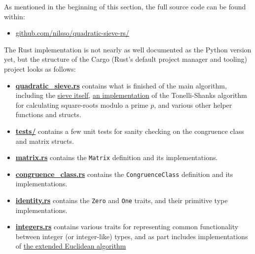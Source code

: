 \documentclass{report}
\begin{document}
\noindent
As mentioned in the beginning of this section, the full source code
can be found within:
\begin{itemize}
    \item \href{https://github.com/nilsso/quadratic-sieve-rs/tree/main/src}{github.com/nilsso/quadratic-sieve-rs/}
\end{itemize}
The Rust implementation is not nearly as well documented as the Python version
yet, but the structure of the Cargo (Rust's default project manager and
tooling) project looks as follows:
\begin{itemize}
    \item %
        \href{https://github.com/nilsso/quadratic-sieve-rs/blob/main/src/quadratic\_sieve.rs}{\textbf{quadratic\_sieve.rs}}
        contains what is finished of the main algorithm, including the
        \href{https://github.com/nilsso/quadratic-sieve-rs/blob/main/src/quadratic\_sieve.rs#L115}{sieve itself},
        \href{https://github.com/nilsso/quadratic-sieve-rs/blob/main/src/quadratic\_sieve.rs#L74}{an implementation}
        of the Tonelli-Shanks algorithm for calculating square-roots modulo a
        prime $p$, and various other helper functions and structs.
    \item %
        \href{https://github.com/nilsso/quadratic-sieve-rs/tree/main/tests}{\textbf{tests/}}
        contains a few unit tests for sanity checking on the congruence class
        and matrix structs.
    \item %
        \href{https://github.com/nilsso/quadratic-sieve-rs/blob/main/src/matrix.rs}{\textbf{matrix.rs}}
        contains the \texttt{Matrix} definition and its implementations.
    \item %
        \href{https://github.com/nilsso/quadratic-sieve-rs/blob/main/src/congruence\_class.rs}{\textbf{congruence\_class.rs}}
        contains the \texttt{CongruenceClass} definition and its implementations.
    \item %
        \href{https://github.com/nilsso/quadratic-sieve-rs/blob/main/src/identity.rs}{\textbf{identity.rs}}
        contains the \texttt{Zero} and \texttt{One} traits, and their primitive type
        implementations.
    \item %
        \href{https://github.com/nilsso/quadratic-sieve-rs/blob/main/src/integers.rs}{\textbf{integers.rs}}
        contains various traits for representing common functionality between
        integer (or integer-like) types, and as part includes implementations of
        \href{https://github.com/nilsso/quadratic-sieve-rs/blob/main/src/integers.rs#L13}{the extended Euclidean algorithm}

\end{itemize}
\end{document}
